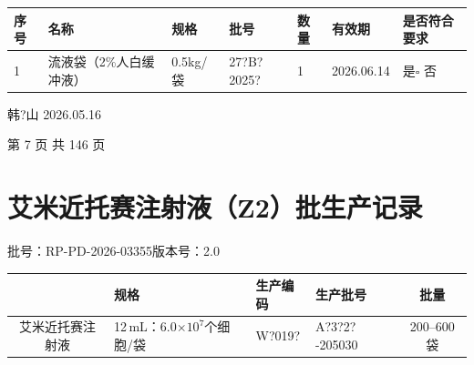 \documentclass[UTF8,10pt,a4paper,fontset=fandol]{ctexart}
\newcommand{\fieldvalue}[1]{#1}
\newcommand{\handwritten}[1]{#1}
\begin{document}
\begin{tabularx}{\textwidth}{|p{0.7cm}|X|p{1.7cm}|p{2.6cm}|p{0.9cm}|p{1.6cm}|p{1.5cm}|}
\hline
序号 & 名称 & 规格 & 批号 & 数量 & 有效期 & 是否符合要求 \\
\hline
1 & 流液袋（2\%人白缓冲液） & 0.5kg/袋 &
\fieldvalue{\handwritten{27?B?2025?}} &
\fieldvalue{\handwritten{1}} &
\fieldvalue{\handwritten{2026.06.14}} &
\fieldvalue{是}\quad $\square$ 否 \\
\hline
\end{tabularx}

\handwritten{韩?山}
\quad
\handwritten{2026.05.16}

\begin{center}
第 7 页 共 146 页
\end{center}

\newpage

\section{艾米近托赛注射液（Z2）批生产记录}

\noindent
批号：RP-PD-2026-03355\qquad 版本号：2.0

\begin{tabularx}{\textwidth}{|c|X|X|X|c|}
\hline
& \textbf{规格} & \textbf{生产编码} & \textbf{生产批号} & \textbf{批量} \\
\hline
艾米近托赛注射液 & 12\,mL：6.0$\times 10^7$个细胞/袋 &
\fieldvalue{\handwritten{W?019?}} &
\fieldvalue{\handwritten{A?3?2?-205030}} &
200--600 袋 \\
\hline
\end{tabularx}

\vspace{0.3em}
\end{document}
